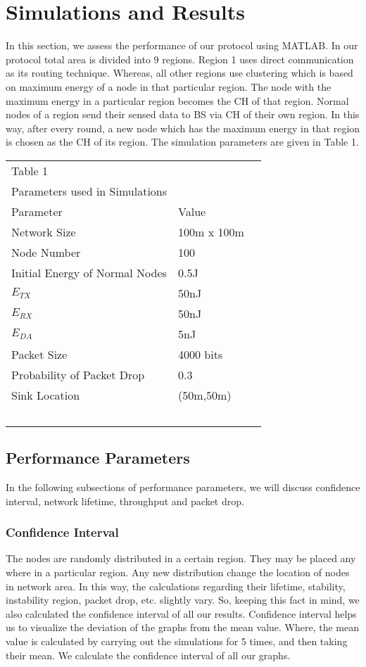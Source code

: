 \documentclass[journal]{IEEEtran}
\begin{document}
\section{Simulations and Results}
In this section, we assess the performance of our protocol using MATLAB. In our protocol total area is divided into 9 regions. Region 1 uses direct communication as its routing technique. Whereas, all other regions use clustering which is based on maximum energy of a node in that particular region. The node with the maximum energy in a particular region becomes the CH of that region. Normal nodes of a region send their sensed data to BS via CH of their own region. In this way, after every round, a new node which has the maximum energy in that region is chosen as the CH of its region. The simulation parameters are given in Table 1.


\begin{center}\begin{tabular}{p{5cm} l  l}
  Table 1&~\\
  Parameters used in Simulations&~\\
  \hline
  Parameter & Value \\
  \hline
  Network Size & 100m x 100m \\ Node Number & 100 \\ Initial Energy of Normal Nodes & 0.5J \\ $E_{TX}$ & 50nJ \\ $E_{RX}$ & 50nJ \\ $E_{DA}$ & 5nJ \\ Packet Size & 4000 bits\\
  Probability of Packet Drop & 0.3\\
  Sink Location & (50m,50m)\\
  \hline
  ~&~\\
\end{tabular}
\end{center}

\subsection{Performance Parameters}

In the following subsections of performance parameters, we will discuss confidence interval, network lifetime, throughput and packet drop.
\subsubsection{Confidence Interval}
The nodes are randomly distributed in a certain region. They may be placed any where in a particular region. Any new distribution change the location of nodes in network area. In this way, the calculations regarding their lifetime, stability, instability region, packet drop, etc. slightly vary. So, keeping this fact in mind, we also calculated the confidence interval of all our results. Confidence interval helps us to visualize the deviation of the graphs from the mean value. Where, the mean value is calculated by carrying out the simulations for 5 times, and then taking their mean. We calculate the confidence interval of all our graphs.
\end{document}
